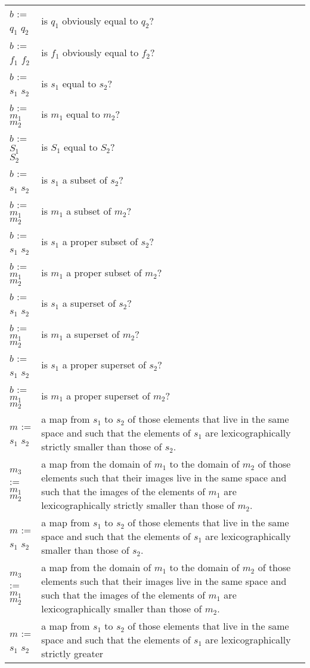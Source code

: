 \begin{supertabular}{p{0.35\textwidth}p{0.6\textwidth}}
$b$ := $q_1$ \ai[\tt]{==} $q_2$ & is $q_1$ obviously equal to $q_2$?
\\
$b$ := $f_1$ \ai[\tt]{==} $f_2$ & is $f_1$ obviously equal to $f_2$?
\\
$b$ := $s_1$ \ai[\tt]{=} $s_2$ & is $s_1$ equal to $s_2$?
\\
$b$ := $m_1$ \ai[\tt]{=} $m_2$ & is $m_1$ equal to $m_2$?
\\
$b$ := $S_1$ \ai[\tt]{=} $S_2$ & is $S_1$ equal to $S_2$?
\\
$b$ := $s_1$ \ai[\tt]{<=} $s_2$ & is $s_1$ a subset of $s_2$?
\\
$b$ := $m_1$ \ai[\tt]{<=} $m_2$ & is $m_1$ a subset of $m_2$?
\\
$b$ := $s_1$ \ai[\tt]{<} $s_2$ & is $s_1$ a proper subset of $s_2$?
\\
$b$ := $m_1$ \ai[\tt]{<} $m_2$ & is $m_1$ a proper subset of $m_2$?
\\
$b$ := $s_1$ \ai[\tt]{>=} $s_2$ & is $s_1$ a superset of $s_2$?
\\
$b$ := $m_1$ \ai[\tt]{>=} $m_2$ & is $m_1$ a superset of $m_2$?
\\
$b$ := $s_1$ \ai[\tt]{>} $s_2$ & is $s_1$ a proper superset of $s_2$?
\\
$b$ := $m_1$ \ai[\tt]{>} $m_2$ & is $m_1$ a proper superset of $m_2$?
\\
$m$ := $s_1$ \ai[\tt]{<<} $s_2$ & a map from
$s_1$ to $s_2$ of those elements that live in the same space and
such that the elements of $s_1$ are lexicographically strictly smaller
than those of $s_2$.
\\
$m_3$ := $m_1$ \ai[\tt]{<<} $m_2$ & a map from the domain of
$m_1$ to the domain of $m_2$ of those elements such that their images
live in the same space and such that the images of the elements of
$m_1$ are lexicographically strictly smaller than those of $m_2$.
\\
$m$ := $s_1$ \ai[\tt]{<<=} $s_2$ & a map from
$s_1$ to $s_2$ of those elements that live in the same space and
such that the elements of $s_1$ are lexicographically smaller
than those of $s_2$.
\\
$m_3$ := $m_1$ \ai[\tt]{<<=} $m_2$ & a map from the domain of
$m_1$ to the domain of $m_2$ of those elements such that their images
live in the same space and such that the images of the elements of
$m_1$ are lexicographically smaller than those of $m_2$.
\\
$m$ := $s_1$ \ai[\tt]{>>} $s_2$ & a map from
$s_1$ to $s_2$ of those elements that live in the same space and
such that the elements of $s_1$ are lexicographically strictly greater

\end{supertabular}
